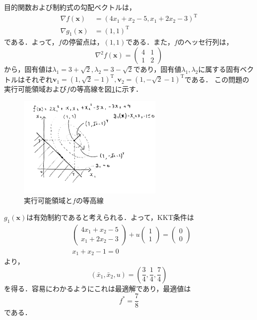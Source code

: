 \documentclass{jsreport}
\begin{document}
目的関数および制約式の勾配ベクトルは，
\begin{align}
  \nabla f(\bm{x}) &= (4x_1 + x_2 - 5, x_1 + 2x_2 - 3)^{\mathrm{T}} \nonumber \\
  \nabla g_1(\bm{x}) &= (1, 1)^{\mathrm{T}} \nonumber
\end{align}
である．よって，$f$の停留点は，$(1, 1)$である．また，$f$のヘッセ行列は，
\begin{equation}
  \nabla^2 f(\bm{x}) = \left(
  \begin{array}{cc}
    4 & 1 \\
    1 & 2
  \end{array}
  \right) \nonumber
\end{equation}
から，固有値は$\lambda_1 = 3 + \sqrt{2}, \lambda_2 = 3 - \sqrt{2}$であり，固有値$\lambda_1, \lambda_2$に属する固有ベクトルはそれぞれ$\bm{v}_1 = (1, \sqrt{2} - 1)^{\mathrm{T}}, \bm{v}_2 = (1, -\sqrt{2} - 1)^{\mathrm{T}}$である．
この問題の実行可能領域および$f$の等高線を図\ref{fig:feasible_ex}に示す．
\begin{figure}[tb]
  \centering
  \includegraphics[clip, width=7cm]{../figure/KKT_3.pdf}
  \caption{実行可能領域と$f$の等高線}
  \label{fig:feasible_ex}
\end{figure}

$g_1(\bm{x})$は有効制約であると考えられる．よって，KKT条件は
\begin{align}
  &\left(
  \begin{array}{c}
    4x_1 + x_2 - 5 \\
    x_1 + 2x_2 - 3
  \end{array}
  \right) + u\left(
  \begin{array}{c}
    1 \\
    1
  \end{array}
  \right) = \left(
  \begin{array}{c}
    0 \\
    0
  \end{array}
  \right) \nonumber \\
  &x_1 + x_2 - 1 = 0 \nonumber
\end{align}
より，
\begin{equation}
  (\bar{x}_1, \bar{x}_2, u) = \left(\frac{3}{4}, \frac{1}{4}, \frac{7}{4} \right) \nonumber
\end{equation}
を得る．容易にわかるようにこれは最適解であり，最適値は
\begin{equation}
  f^{*} = \frac{7}{8} \nonumber
\end{equation}
である．
\end{document}
